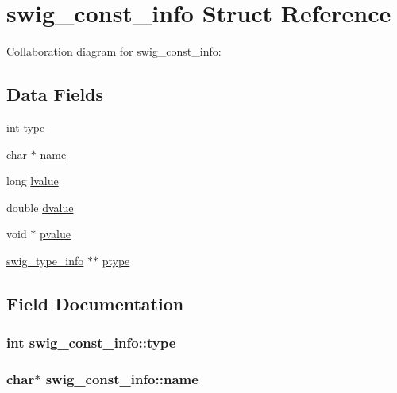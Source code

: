 \hypertarget{structswig__const__info}{
\section{swig\_\-const\_\-info Struct Reference}
\label{structswig__const__info}
}
Collaboration diagram for swig\_\-const\_\-info:\subsection*{Data Fields}
\begin{CompactItemize}
\item 
int \hyperlink{structswig__const__info_e8bbc99e1cda11f24e306365cbf33893}{type}
\item 
char $\ast$ \hyperlink{structswig__const__info_ad383d74116313cf9a8532e163368050}{name}
\item 
long \hyperlink{structswig__const__info_f142e4c21ad4fe61f6c2624bff034583}{lvalue}
\item 
double \hyperlink{structswig__const__info_74e477f1dbf515bcb7e2ef07a1d34c35}{dvalue}
\item 
void $\ast$ \hyperlink{structswig__const__info_bbc43512c364bff11fac5961c1155090}{pvalue}
\item 
\hyperlink{structswig__type__info}{swig\_\-type\_\-info} $\ast$$\ast$ \hyperlink{structswig__const__info_edd46d173c5b5ed4ee60ad5660233557}{ptype}
\end{CompactItemize}


\subsection{Field Documentation}
\hypertarget{structswig__const__info_e8bbc99e1cda11f24e306365cbf33893}{
\subsubsection{\setlength{\rightskip}{0pt plus 5cm}int {\bf swig\_\-const\_\-info::type}}}
\label{structswig__const__info_e8bbc99e1cda11f24e306365cbf33893}


\hypertarget{structswig__const__info_ad383d74116313cf9a8532e163368050}{
\subsubsection{\setlength{\rightskip}{0pt plus 5cm}char$\ast$ {\bf swig\_\-const\_\-info::name}}}
\label{structswig__const__info_ad383d74116313cf9a8532e163368050}


